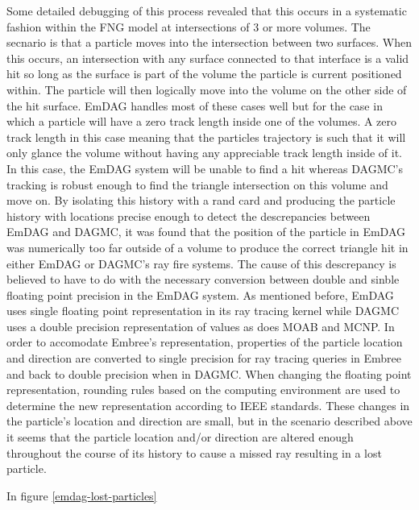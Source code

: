 \documentclass[12pt, a4paper]{article}
\begin{document}
Some detailed debugging of this process revealed that this occurs in a systematic fashion within the FNG model at intersections of 3 or more volumes. The secnario is that a particle moves into the intersection between two surfaces. When this occurs, an intersection with any surface connected to that interface is a valid hit so long as the surface is part of the volume the particle is current positioned within. The particle will then logically move into the volume on the other side of the hit surface. EmDAG handles most of these cases well but for the case in which a particle will have a zero track length inside one of the volumes. A zero track length in this case meaning that the particles trajectory is such that it will only glance the volume without having any appreciable track length inside of it. In this case, the EmDAG system will be unable to find a hit whereas DAGMC's tracking is robust enough to find the triangle intersection on this volume and move on. By isolating this history with a rand card and producing the particle history with locations precise enough to detect the descrepancies between EmDAG and DAGMC, it was found that the position of the particle in EmDAG was numerically too far outside of a volume to produce the correct triangle hit in either EmDAG or DAGMC's ray fire systems. The cause of this descrepancy is believed to have to do with the necessary conversion between double and sinble floating point precision in the EmDAG system. As mentioned before, EmDAG uses single floating point representation in its ray tracing kernel while DAGMC uses a double precision representation of values as does MOAB and MCNP. In order to accomodate Embree's representation, properties of the particle location and direction are converted to single precision for ray tracing queries in Embree and back to double precision when in DAGMC. When changing the floating point representation, rounding rules based on the computing environment are used to determine the new representation according to IEEE standards. \cite{IEEE754_2008} These changes in the particle's location and direction are small, but in the scenario described above it seems that the particle location and/or direction are altered enough throughout the course of its history to cause a missed ray resulting in a lost particle.

In figure \ref{emdag-lost-particles} 
\end{document}
